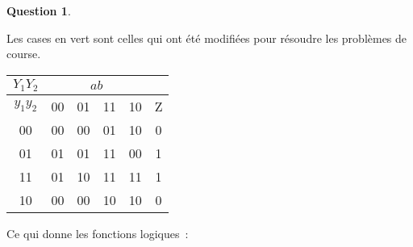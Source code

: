 \documentclass[11pt,a4paper]{article}
\theoremstyle{definition}%
\newtheorem{Q}{Question}[] %
\begin{document}
\begin{Q}
\begin{enumerate}
{		Les cases en {\color{green}vert} sont celles qui ont été modifiées pour résoudre les problèmes de course.
		\begin{center}
			\begin{tabular}{|c|c|c|c|c|c|}\hline
			$Y_1Y_2$ & \multicolumn{4}{c|}{$ab$} & \\ \hline
			$y_1y_2$ & 00 & 01 & 11 & 10 & Z \\ \hline
			00       & 00 & 00 & {\color{green}01} & {\color{green}10} & 0 \\ \hline
			01       & 01 & 01 & 11 & {\color{green}00} & 1 \\ \hline
			11       & 01 & {\color{green}10} & 11 & 11 & 1 \\ \hline
			10       & 00 & {\color{green}00} & 10 & 10 & 0 \\ \hline
			\end{tabular}
		\end{center}

		Ce qui donne les fonctions logiques~:

		\begin{center}
		\end{center}
		
		\begin{center}
		\end{center}

		\begin{center}
		\end{center}

	}
\end{enumerate}
\end{Q}
\end{document}
